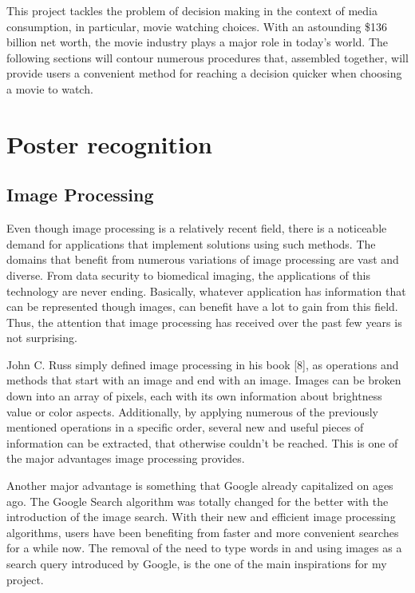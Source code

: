 \documentclass[12pt,a4paper,twoside]{report}
\begin{document}
This project tackles the problem of decision making in the context of media consumption, in particular, movie watching choices. With an astounding \$136  billion net worth, the movie industry plays a major role in today's world. The following sections will contour numerous procedures that, assembled together, will provide users a convenient method for reaching a decision quicker when choosing a movie to watch.



\section{Poster recognition}

\subsection{Image Processing}

Even though image processing is a relatively recent field, there is a noticeable demand for applications that implement solutions using such methods. The domains that benefit from numerous variations of image processing are vast and diverse. From data security to biomedical imaging, the applications of this technology are never ending. Basically, whatever application has information that can be represented though images, can benefit have a lot to gain from this field. Thus, the attention that image processing has received over the past few years is not surprising. 

John C. Russ simply defined image processing in his book [8], as operations and methods that start with an image and end with an image. Images can be broken down into an array of pixels, each with its own information about brightness value or color aspects. Additionally, by applying numerous of the previously mentioned operations in a specific order, several new and useful pieces of information can be extracted, that otherwise couldn't be reached. This is one of the major advantages image processing provides.

Another major advantage is something that Google already capitalized on ages ago. The Google Search algorithm was totally changed for the better with the introduction of the image search. With their new and efficient image processing algorithms, users have been benefiting from faster and more convenient searches for a while now. The removal of the need to type words in and using images as a search query introduced by Google, is the one of the main inspirations for my project.
\end{document}
